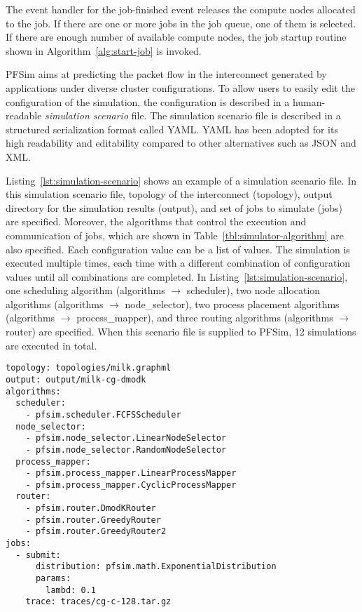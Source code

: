 The event handler for the job-finished event releases the compute nodes
allocated to the job. If there are one or more jobs in the job queue, one of
them is selected. If there are enough number of available compute nodes, the
job startup routine shown in Algorithm~\ref{alg:start-job} is invoked.

PFSim aims at predicting the packet flow in the interconnect generated by
applications under diverse cluster configurations. To allow users to easily
edit the configuration of the simulation, the configuration is described in a
human-readable \emph{simulation scenario} file. The simulation scenario file
is described in a structured serialization format called YAML\@. YAML has been
adopted for its high readability and editability compared to other
alternatives such as JSON and XML\@.

Listing~\ref{lst:simulation-scenario} shows an example of a simulation
scenario file. In this simulation scenario file, topology of the interconnect
(topology), output directory for the simulation results (output), and set of
jobs to simulate (jobs) are specified. Moreover, the algorithms that control
the execution and communication of jobs, which are shown in
Table~\ref{tbl:simulator-algorithm} are also specified. Each configuration
value can be a list of values. The simulation is executed multiple times, each
time with a different combination of configuration values until all
combinations are completed. In Listing~\ref{lst:simulation-scenario}, one
scheduling algorithm (algorithms $\to$ scheduler), two node allocation
algorithms (algorithms $\to$ node\_selector), two process placement algorithms
(algorithms $\to$ process\_mapper), and three routing algorithms (algorithms
$\to$ router) are specified. When this scenario file is supplied to PFSim, 12
simulations are executed in total.

\begin{lstlisting}[caption={Example of a Simulation Scenario},%
                   label={lst:simulation-scenario}, linewidth={\columnwidth},%
                   float={htbp}]
topology: topologies/milk.graphml
output: output/milk-cg-dmodk
algorithms:
  scheduler:
    - pfsim.scheduler.FCFSScheduler
  node_selector:
    - pfsim.node_selector.LinearNodeSelector
    - pfsim.node_selector.RandomNodeSelector
  process_mapper:
    - pfsim.process_mapper.LinearProcessMapper
    - pfsim.process_mapper.CyclicProcessMapper
  router:
    - pfsim.router.DmodKRouter
    - pfsim.router.GreedyRouter
    - pfsim.router.GreedyRouter2
jobs:
  - submit:
      distribution: pfsim.math.ExponentialDistribution
      params:
        lambd: 0.1
    trace: traces/cg-c-128.tar.gz
\end{lstlisting}


